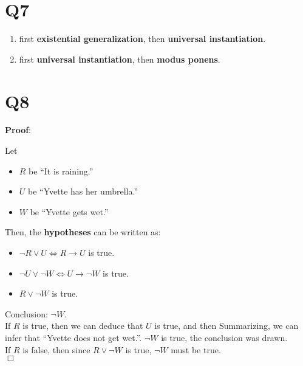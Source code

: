 \documentclass[11pt]{article}
\newenvironment{qparts}{\begin{enumerate}[{(}a{)}]}{\end{enumerate}}
\def\endproofmark{$\Box$}
\newenvironment{proof}{\par{\bf Proof}:}{\endproofmark\smallskip}
\begin{document}
\section*{Q7}
\begin{qparts}
    
    \item first \textbf{existential generalization}, then \textbf{universal instantiation}. 
    \item first \textbf{universal instantiation}, then \textbf{modus ponens}.
\end{qparts}

\section*{Q8}
\begin{proof}
    
    Let
    \begin{itemize}
        
        \item $R$ be ``It is raining.''
        \item $U$ be ``Yvette has her umbrella.''
        \item $W$ be ``Yvette gets wet.''
    \end{itemize}
    Then, the \textbf{hypotheses} can be written as:
    \begin{itemize}
        
        \item $\lnot R\lor U \iff R\to U$ is true.
        \item $\lnot U \lor \lnot W \iff U \to \lnot W$ is true.
        \item $R \lor \lnot W$ is true.
    \end{itemize}
    Conclusion: $\lnot W$.\\
    If $R$ is true, then we can deduce that $U$ is true, and then
    Summarizing, we can infer that ``Yvette does not get wet.''.
    $\lnot W$ is true, the conclusion was drawn.\\
    If $R$ is false, then since $R\lor \lnot W$ is true, $\lnot W$ must be true.
    \\
\end{proof}
\end{document}

